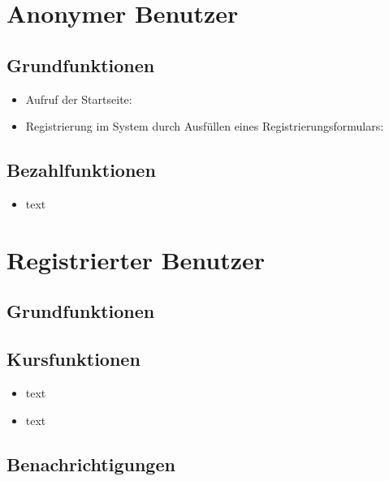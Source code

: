 \documentclass[a4paper]{scrreprt}
\begin{document}
	

	\section{Anonymer Benutzer}
		\subsection{Grundfunktionen}
			\begin{itemize}
				\item {Aufruf der Startseite:}
               \blindtext
			    \item {Registrierung im System durch Ausfüllen eines Registrierungsformulars:}
                \blindtext
			    
			\end{itemize}
		\subsection{Bezahlfunktionen}
			
			\begin{itemize}
			    \item {text} \blindtext
			    
			\end{itemize}
	
	\section{Registrierter Benutzer}
	
	
		\subsection{Grundfunktionen}
			
		\subsection{Kursfunktionen}
			
			\begin{itemize}
			    \item {text} 
                \blindtext
			    \item {text} 
               \blindtext
			\end{itemize}
		\subsection{Benachrichtigungen}
			
			
	
\end{document}
